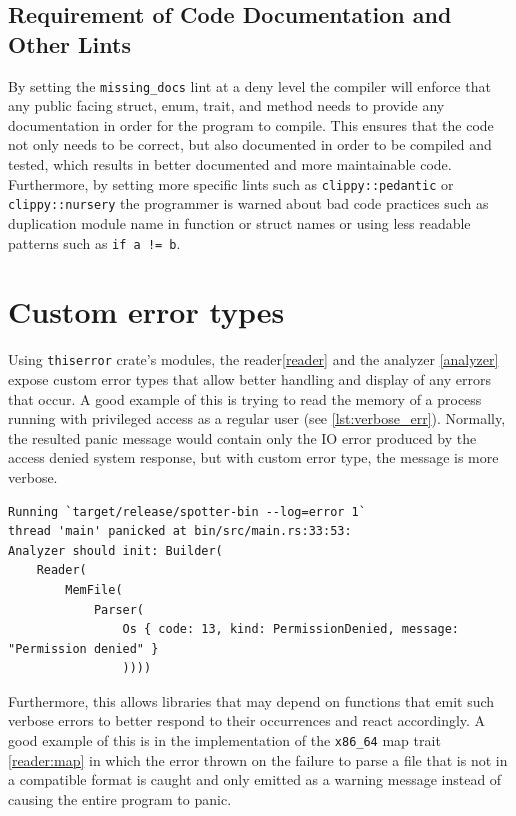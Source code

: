     \subsection{Requirement of Code Documentation and Other Lints}

    By setting the \verb|missing_docs| lint at a deny level the compiler will enforce that any public facing struct, enum, trait, and method needs to provide any documentation in order for the program to compile. This ensures that the code not only needs to be correct, but also documented in order to be compiled and tested, which results in better documented and more maintainable code. 
    Furthermore, by setting more specific lints such as \verb|clippy::pedantic| or \verb|clippy::nursery| the programmer is warned about bad code practices such as duplication module name in function or struct names or using less readable patterns such as \verb|if a != b|.

\section{Custom error types}

Using \verb|thiserror| crate's \cite{tolnay_dtolnaythiserror_2024} modules, the reader\autoref{reader} and the analyzer \autoref{analyzer} expose custom error types that allow better handling and display of any errors that occur. 
A good example of this is trying to read the memory of a process running with privileged access as a regular user (see \autoref{lst:verbose_err}). Normally, the resulted panic message would contain only the IO error produced by the access denied system response, but with custom error type, the message is more verbose.

\begin{lstlisting}[caption=\label{lst:verbose_err}"Error when trying to read the pid 1 process"]
Running `target/release/spotter-bin --log=error 1`
thread 'main' panicked at bin/src/main.rs:33:53:
Analyzer should init: Builder(
    Reader(
        MemFile(
            Parser(
                Os { code: 13, kind: PermissionDenied, message: "Permission denied" }
                ))))
\end{lstlisting}

Furthermore, this allows libraries that may depend on functions that emit such verbose errors to better respond to their occurrences and react accordingly. 
A good example of this is in the implementation of the \verb|x86_64| map trait \autoref{reader:map} in which the error thrown on the failure to parse a file that is not in a compatible format is caught and only emitted as a warning message instead of causing the entire program to panic.

